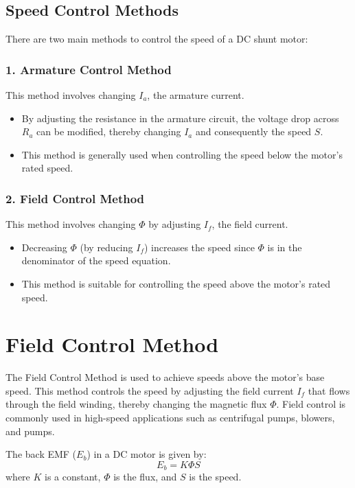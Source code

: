 \documentclass[a4paper,12pt]{article}
\begin{document}
	\subsection*{Speed Control Methods}
	There are two main methods to control the speed of a DC shunt motor:
	
	\subsubsection*{1. Armature Control Method}
	This method involves changing \( I_a \), the armature current.
	\begin{itemize}
		\item By adjusting the resistance in the armature circuit, the voltage drop across \( R_a \) can be modified, thereby changing \( I_a \) and consequently the speed \( S \).
		\item This method is generally used when controlling the speed below the motor's rated speed.
	\end{itemize}
	
	\subsubsection*{2. Field Control Method}
	This method involves changing \( \Phi \) by adjusting \( I_f \), the field current.
	\begin{itemize}
		\item Decreasing \( \Phi \) (by reducing \( I_f \)) increases the speed since \( \Phi \) is in the denominator of the speed equation.
		\item This method is suitable for controlling the speed above the motor’s rated speed.
	\end{itemize}
	
	\section*{Field Control Method}
	
	The Field Control Method is used to achieve speeds above the motor’s base speed. This method controls the speed by adjusting the field current \( I_f \) that flows through the field winding, thereby changing the magnetic flux \( \Phi \). Field control is commonly used in high-speed applications such as centrifugal pumps, blowers, and pumps.
	

	The back EMF (\( E_b \)) in a DC motor is given by:
	\[
	E_b = K \Phi S
	\]
	where \( K \) is a constant, \( \Phi \) is the flux, and \( S \) is the speed.
	
\end{document}

